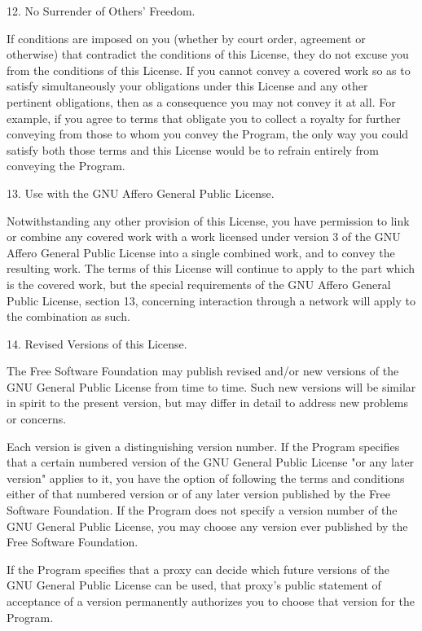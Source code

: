 \documentclass[parskip=half]{scrartcl}
\begin{document}
  12. No Surrender of Others' Freedom.

  If conditions are imposed on you (whether by court order, agreement or
otherwise) that contradict the conditions of this License, they do not
excuse you from the conditions of this License.  If you cannot convey a
covered work so as to satisfy simultaneously your obligations under this
License and any other pertinent obligations, then as a consequence you may
not convey it at all.  For example, if you agree to terms that obligate you
to collect a royalty for further conveying from those to whom you convey
the Program, the only way you could satisfy both those terms and this
License would be to refrain entirely from conveying the Program.

  13. Use with the GNU Affero General Public License.

  Notwithstanding any other provision of this License, you have
permission to link or combine any covered work with a work licensed
under version 3 of the GNU Affero General Public License into a single
combined work, and to convey the resulting work.  The terms of this
License will continue to apply to the part which is the covered work,
but the special requirements of the GNU Affero General Public License,
section 13, concerning interaction through a network will apply to the
combination as such.

  14. Revised Versions of this License.

  The Free Software Foundation may publish revised and/or new versions of
the GNU General Public License from time to time.  Such new versions will
be similar in spirit to the present version, but may differ in detail to
address new problems or concerns.

  Each version is given a distinguishing version number.  If the
Program specifies that a certain numbered version of the GNU General
Public License "or any later version" applies to it, you have the
option of following the terms and conditions either of that numbered
version or of any later version published by the Free Software
Foundation.  If the Program does not specify a version number of the
GNU General Public License, you may choose any version ever published
by the Free Software Foundation.

  If the Program specifies that a proxy can decide which future
versions of the GNU General Public License can be used, that proxy's
public statement of acceptance of a version permanently authorizes you
to choose that version for the Program.
\end{document}
